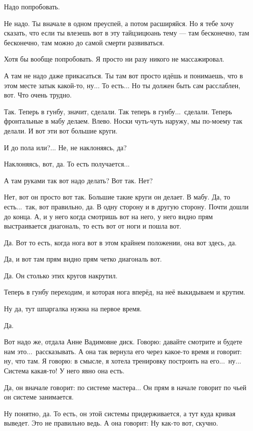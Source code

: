 \I
Надо попробовать.

\M
Не надо. Ты вначале в одном преуспей, а потом расширяйся. Но я тебе хочу сказать,
что если ты влезешь вот в эту тайцзицюань тему --- там
бесконечно, там бесконечно, там можно до самой смерти развиваться.

\I
Хотя бы вообще попробовать. Я просто ни разу никого не массажировал.

\M
А там не надо даже прикасаться. Ты
там вот просто идёшь и понимаешь, что в
этом месте затык какой-то, ну... То есть... Но ты должен быть сам расслаблен, вот.
Что очень трудно.

\I
Так. Теперь в гунбу, значит, сделали. Так теперь в гунбу...\ сделали. Теперь фронтальные в мабу
делаем. Влево.
Носки чуть-чуть наружу, мы по-моему так делали.
И вот эти вот большие круги.

\M
И до пола или?... Не, не наклоняясь, да?

\I
Наклоняясь, вот, да. То есть получается...

\M
А там руками так вот надо делать? Вот так. Нет?

\I
Нет, вот он просто вот так. Большие такие
круги он делает. В мабу.
Да, то есть...\ так, вот правильно, да.
В одну сторону и в другую сторону.
Почти дошли до конца.
А, и у него когда смотришь вот на него, у него видно прям выстраивается диагональ, то
есть вот от ноги и пошла вот.

\M
Да. Вот то
есть, когда нога вот в этом крайнем положении, она вот здесь, да.

\I
Да, и вот там прям видно прям четко диагональ вот.

\M
Да. Он столько этих кругов накрутил.

\I
Теперь в гунбу переходим, и которая нога вперёд, на неё выкидываем и крутим.

\M
Ну да, тут шпаргалка нужна на первое время.

\I
Да.

\M
Вот надо же, отдала Анне Вадимовне диск. Говорю: давайте смотрите и будете нам это...\
рассказывать.
А она так вернула его через какое-то время
и говорит: ну, что там.
Я говорю: в смысле, я хотела тренировку построить на его...\ ну...
Система какая-то! У него явно она есть.

\I
Да, он вначале говорит: по системе мастера...
Он прям в начале говорит по чьей он системе
занимается.

\M
Ну понятно, да. То есть, он этой системы придерживается, а тут куда кривая выведет.
Это не правильно ведь.
А она говорит: Ну как-то вот, скучно.

